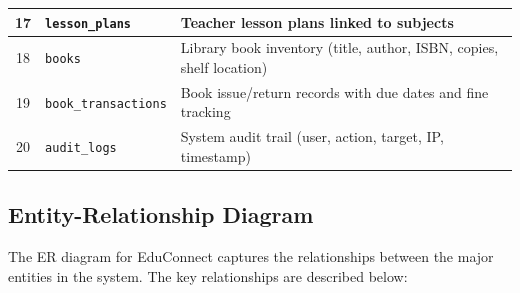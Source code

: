 \begin{table}[H]
\begin{tabular}{|c|p{3.5cm}|p{7.5cm}|}
\hline
17 & \texttt{lesson\_plans} & Teacher lesson plans linked to subjects \\
\hline
18 & \texttt{books} & Library book inventory (title, author, ISBN, copies, shelf location) \\
\hline
19 & \texttt{book\_transactions} & Book issue/return records with due dates and fine tracking \\
\hline
20 & \texttt{audit\_logs} & System audit trail (user, action, target, IP, timestamp) \\
\hline
\end{tabular}
\end{table}

\subsection{Entity-Relationship Diagram}

The ER diagram for EduConnect captures the relationships between the major entities in the system. The key relationships are described below:

